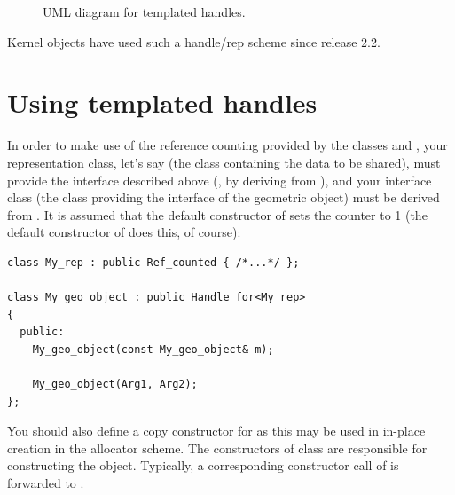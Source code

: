 \begin{figure}[ht]
\caption{UML diagram for templated handles.\label{fig:HandleFor}}
\end{figure}

Kernel objects have used such a handle/rep scheme since release 2.2. 

\section{Using templated handles}
In order to make use of the reference counting provided by the
classes  and , your representation class, 
let's say  (the class containing the data to be shared), 
must provide the interface described above (\eg, by deriving 
from ), and your interface class (the class providing
the interface of the geometric object) must be derived from 
. It is assumed that the default constructor of
 sets the counter to 1 (the default constructor of 
 does this, of course): 

\begin{verbatim}
class My_rep : public Ref_counted { /*...*/ };

class My_geo_object : public Handle_for<My_rep> 
{
  public:
    My_geo_object(const My_geo_object& m);

    My_geo_object(Arg1, Arg2);
};
\end{verbatim}

You should also define a copy constructor for  as this may be used 
in in-place creation in the allocator scheme.
The constructors of class  are responsible for constructing
the  object. 
Typically, a corresponding constructor call of  is forwarded 
to .


